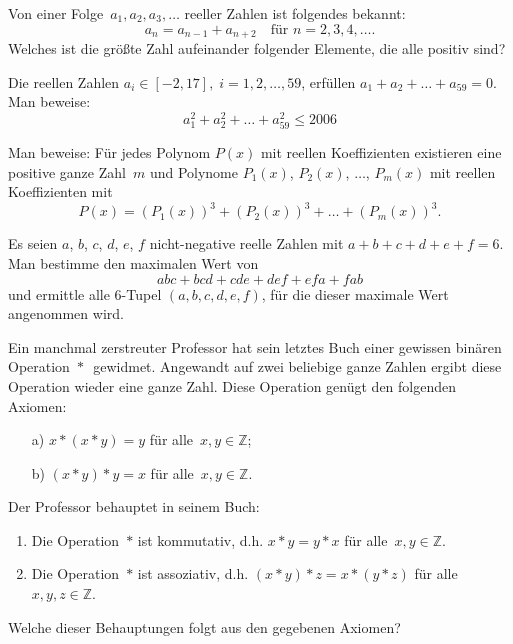 \documentclass{bw06}
\begin{document}
\maketitle

\begin{problems}

\item
  Von einer Folge~$a_1, a_2, a_3, \dots$ reeller Zahlen ist folgendes bekannt:
  \[a_n=a_{n-1}+a_{n+2} \quad \text{f{\"u}r } n=2,3,4,\dots.\]
  Welches ist die gr{\"o}{\ss}te Zahl aufeinander folgender Elemente, die alle positiv sind?

\item
  Die reellen Zahlen
$a_i\in[-2, 17],\; i = 1, 2, \dots, 59$, erf{\"u}llen
$a_1+a_2+\dots+a_{59}=0$. \\ Man beweise:
\[a_1^2 + a_2^2 + \dots + a_{59}^2 \le 2006\]

\item Man beweise: F{\"u}r jedes Polynom $P(x)$ mit reellen
Koeffizienten existieren eine positive ganze Zahl~$m$ und Polynome
$P_1(x)$, $P_2(x)$, $\ldots$, $P_m(x)$ mit reellen Koeffizienten
mit
\[P(x)=(P_1(x))^3+(P_2(x))^3+\ldots+(P_m(x))^3.\]

\item Es seien $a$, $b$, $c$, $d$, $e$, $f$ nicht-negative reelle
Zahlen mit $a+b+c+d+e+f=6$. Man bestimme den maximalen Wert von
\[abc+bcd+cde+def+efa+fab\] und ermittle alle $6$-Tupel
$(a,b,c,d,e,f)$, f{\"u}r die dieser maximale Wert angenommen wird.

\item Ein manchmal zerstreuter Professor hat sein letztes Buch
einer gewissen bin{\"a}ren Operation~$*$\,\, gewidmet. Angewandt auf
zwei beliebige ganze Zahlen ergibt diese Operation wieder eine
ganze Zahl. Diese Operation gen{\"u}gt den folgenden Axiomen:
  \begin{itemize}
    \item[a) ] $x*(x*y)=y$ f{\"u}r alle~$x,y \in \mathbb{Z}$;
    \item[b) ] $(x*y)*y=x$ f{\"u}r alle~$x,y \in \mathbb{Z}$.
  \end{itemize}
Der Professor behauptet in seinem Buch:
  \begin{enumerate}
  \item Die Operation~$*$ ist kommutativ, d.h.
    $x*y=y*x$ f{\"u}r alle~$x,y \in \mathbb{Z}$.
  \item Die Operation~$*$ ist assoziativ, d.h.
    $(x*y)*z=x*(y*z)$ f{\"u}r alle~$x,y,z \in \mathbb{Z}$.
  \end{enumerate}
Welche dieser Behauptungen folgt aus den gegebenen Axiomen?


\end{problems}
\end{document}
